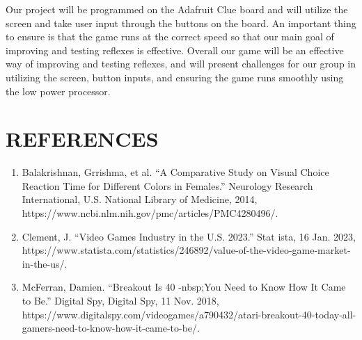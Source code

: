 \documentclass[12pt]{article}
\begin{document}
Our project will be programmed on the Adafruit Clue board and will utilize the screen and take user input through the buttons on the board. An important thing to ensure is that the game runs at the correct speed so that our main goal of improving and testing reflexes is effective. Overall our game will be an effective way of improving and testing reflexes, and will present challenges for our group in utilizing the screen, button inputs, and ensuring the game runs smoothly using the low power processor.

\section{  REFERENCES}

\begin{enumerate}

\item Balakrishnan, Grrishma, et al. “A Comparative Study on Visual Choice Reaction Time for Different Colors in Females.” Neurology Research  International, U.S. National Library of Medicine, 2014, https://www.ncbi.nlm.nih.gov/pmc/articles/PMC4280496/.

\item Clement, J. “Video Games Industry in the U.S. 2023.” Stat
ista, 16 Jan. 2023, https://www.statista.com/statistics/246892/value-of-the-video-game-market-in-the-us/. 

\item McFerran, Damien. “Breakout Is 40 -nbsp;You Need to Know How It Came to Be.” Digital Spy, Digital Spy, 11 Nov. 2018, https://www.digitalspy.com/videogames/a790432/atari-breakout-40-today-all-gamers-need-to-know-how-it-came-to-be/. 
\end{enumerate}
\newpage
\printbibliography
%
%
\end{document}
